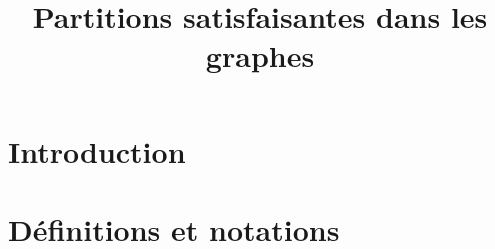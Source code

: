 





\title{Partitions satisfaisantes dans les graphes}
\author{}
\date{}
\maketitle
\tableofcontents
\newpage

\section{Introduction}\label{sec:intro}
%
%



\section{Définitions et notations}\label{sec:defs}

